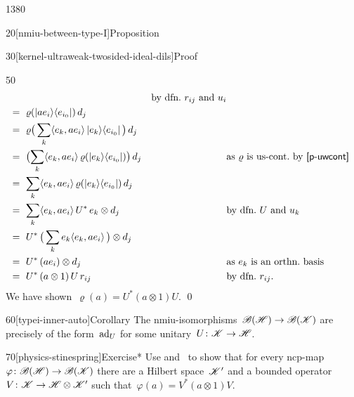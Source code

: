 \begin{parsec}{1380}
\begin{point}{20}[nmiu-between-type-I]{Proposition}
\begin{point}{30}[kernel-ultraweak-twosided-ideal-dils]{Proof}
\begin{point}{50}
\begin{align*}
            &\qquad&\text{by dfn.~$r_{ij}$ and~$u_i$}\\
        & \ = \ \varrho(\ketbra{a e_i}{e_{i_0}}) \,d_j \\
        & \ = \ \varrho\bigl(\, \sum_k \langle e_k, ae_i \rangle
                    \ketbra{e_k}{e_{i_0}} \, \bigr)\,d_j  \\
        & \ = \ \bigl( \sum_k  \langle e_k, ae_i \rangle
                    \, \varrho(\ketbra{e_k}{e_{i_0}})\bigr)\,d_j 
                    &&\text{as $\varrho$ is us-cont.~by~\sref{p-uwcont}} \\
        & \ = \  \sum_k  \langle e_k, ae_i \rangle
                    \, \varrho(\ketbra{e_k}{e_{i_0}})\,d_j \\
        & \ = \ \sum_k  \langle e_k, ae_i \rangle
                    \, U^*\, e_k\otimes d_j 
                    && \text{by dfn.~$U$ and~$u_k$}\\
        & \ = \  U^*\,  \bigl(\, \sum_k e_k \langle e_k, ae_i \rangle 
                   \, \bigr)  \otimes d_j\\
        & \ = \  U^*\,  (ae_i) \otimes d_j 
                   && \text{as $e_k$ is an orthn.~basis}\\
        & \ = \  U^*\,  (a \otimes 1) \, U \, r_{ij} && \text{by dfn.~$r_{ij}$.}
\end{align*}
\endgroup
We have shown~$\varrho(a) = U^* (a \otimes 1) U$. \qed
\end{point}
\end{point}
\begin{point}{60}[typei-inner-auto]{Corollary}%
The nmiu-isomorphisms~$\mathscr{B}(\mathscr{H}) \to \mathscr{B}(\mathscr{K})$
    are precisely of the form~$\mathrm{ad}_U$
    for some unitary~$U\colon \mathscr{K} \to \mathscr{H}$.
\end{point}
\end{point}
\begin{point}{70}[physics-stinespring]{Exercise*}%
Use  and~ to show
    that for every ncp-map~$\varphi\colon \mathscr{B}(\mathscr{H}) \to \mathscr{B}(\mathscr{K})$
    there are a Hilbert space~$\mathscr{K}'$
    and a bounded operator~$V\colon \mathscr{K} \to \mathscr{H} \otimes \mathscr{K}'$
    such that~$\varphi(a) = V^* (a \otimes 1)V$.


\end{point}
\end{parsec}
